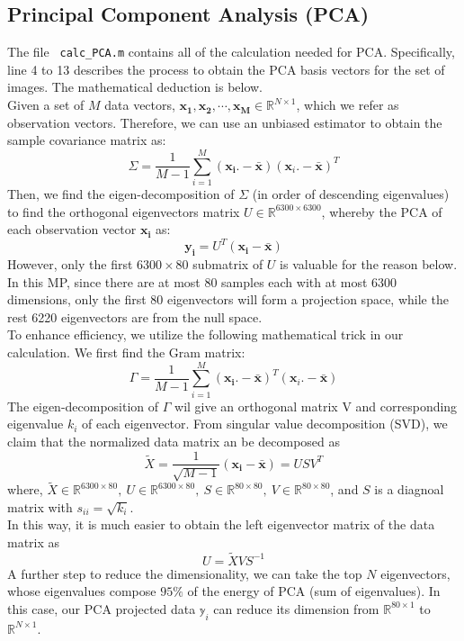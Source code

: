 \documentclass{article}
\begin{document}
	\subsection{Principal Component Analysis (PCA)}
	The file \texttt{ calc\_PCA.m} contains all of the calculation needed for PCA. Specifically, line 4 to 13 describes the process to obtain the PCA basis vectors for the set of images. The mathematical deduction is below.\\
	Given a set of $M$ data vectors, $\mathbf{x_1, x_2, \cdots, x_M}\in\mathbb{R}^{N\times1}$, which we refer as observation vectors. Therefore, we can use an unbiased estimator to obtain the sample covariance matrix as:
	\begin{equation}
	\Sigma = \frac{1}{M-1} \sum_{i=1}^{M}(\mathbf{x_i}.-\bar{\mathbf{x}})(\mathbf{x}_i.-\bar{\mathbf{x}})^T
	\end{equation}
	Then, we find the eigen-decomposition of $\Sigma$ (in order of descending eigenvalues) to find the orthogonal eigenvectors matrix $U\in\mathbb{R}^{6300\times6300}$, whereby the PCA of each observation vector $\mathbf{x_i}$ as:
	\begin{equation}
	\mathbf{y_i}=U^T(\mathbf{x_i}-\bar{\mathbf{x}})
	\end{equation} However, only the first $6300\times80$ submatrix of $U$ is valuable for the reason below. In this MP, since there are at most 80 samples each with at most 6300 dimensions, only the first 80 eigenvectors will form a projection space, while the rest 6220 eigenvectors are from the null space.\\
	To enhance efficiency, we utilize the following mathematical trick in our calculation. We first find the Gram matrix: 
	\begin{equation}
	\Gamma = \frac{1}{M-1} \sum_{i=1}^{M}(\mathbf{x_i}.-\bar{\mathbf{x}})^T(\mathbf{x}_i.-\bar{\mathbf{x}})
	\end{equation}
	The eigen-decomposition of $\Gamma$ wil give an orthogonal matrix V and corresponding eigenvalue $k_i$ of each eigenvector. From singular value decomposition (SVD), we claim that the normalized data matrix an be decomposed as
	 \begin{equation}
	 \tilde{X} =\frac{1}{\sqrt{M-1}}(\mathbf{x_i}-\bar{\mathbf{x}})=USV^T
	 \end{equation}  
	 where, $\tilde{X}\in\mathbb{R}^{6300\times80},~U\in\mathbb{R}^{6300\times80},~ S\in\mathbb{R}^{80\times80},~ V\in\mathbb{R}^{80\times80}$, and $S$ is a diagnoal matrix with $s_{ii}=\sqrt{k_i}$.\\
	 In this way, it is much easier to obtain the left eigenvector matrix of the data matrix as 
	 \begin{equation}
	 U=\tilde{X} VS^{-1}
	 \end{equation}
     A further step to reduce the dimensionality, we can take the top $N$ eigenvectors, whose eigenvalues compose $95\%$ of the energy of PCA (sum of eigenvalues). In this case, our PCA projected data $\mathbb{y}_i$ can reduce its dimension from $\mathbb{R}^{80\times1}$ to $\mathbb{R}^{N\times1}$.\\
     
\end{document}
